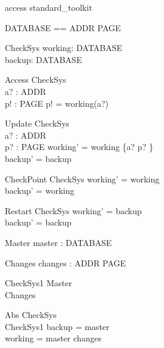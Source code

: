 \documentclass{llncs}
\begin{document}
\begin{zsection}
\SECTION access \parents standard\_toolkit
\end{zsection}

\begin{zed}
\end{zed}

\begin{zed}
DATABASE == ADDR \fun PAGE
\end{zed}

\begin{schema}{CheckSys}
working: DATABASE \\
backup: DATABASE
\end{schema}

\begin{schema}{Access}
\Xi CheckSys \\
a? : ADDR \\
p! : PAGE
\where
p! = working(a?)
\end{schema}

\begin{schema}{Update}
\Delta CheckSys \\
a? : ADDR \\
p? : PAGE
\where
working' = working \oplus \{a? \mapsto p? \} \\
backup' = backup
\end{schema}

\begin{schema}{CheckPoint}
\Delta CheckSys
\where
working' = working \\
backup' = working
\end{schema}

\begin{schema}{Restart}
\Delta CheckSys
\where
working' = backup \\
backup' = backup
\end{schema}

\begin{schema}{Master}
master : DATABASE
\end{schema}

\begin{schema}{Changes}
changes : ADDR \pfun PAGE
\end{schema}

\begin{schema}{CheckSys1}
Master \\
Changes
\end{schema}

\begin{schema}{Abs}
CheckSys \\
CheckSys1
\where
backup = master \\
working = master \oplus changes
\end{schema}
\end{document}
